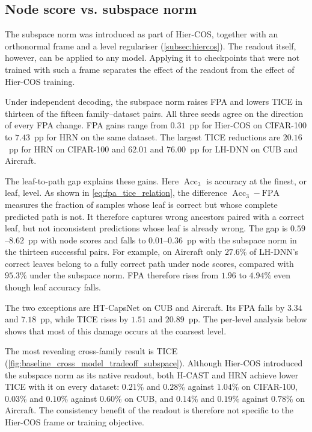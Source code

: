 \subsection{Node score vs. subspace norm}
\label{ssec:results_readout}

The subspace norm was introduced as part of Hier-COS, together with an
orthonormal frame and a level regulariser (\cref{subsec:hiercos}). The
readout itself, however, can be applied to any model. Applying it to checkpoints
that were not trained with such a frame separates the effect of the readout from
the effect of Hier-COS training.

Under independent decoding, the subspace norm raises FPA and lowers TICE in
thirteen of the fifteen family--dataset pairs. All three seeds agree on the
direction of every FPA change. FPA gains range from $0.31$~pp for Hier-COS on
CIFAR-100 to $7.43$~pp for HRN on the same dataset. The largest TICE reductions
are $20.16$~pp for HRN on CIFAR-100 and $62.01$ and $76.00$~pp for LH-DNN on CUB
and Aircraft.

The leaf-to-path gap explains these gains. Here $\operatorname{Acc}_3$ is
accuracy at the finest, or leaf, level. As shown in
\cref{eq:fpa_tice_relation}, the difference
$\operatorname{Acc}_3-\mathrm{FPA}$ measures the fraction of samples whose leaf
is correct but whose complete predicted path is not. It therefore captures wrong ancestors paired with a correct
leaf, but not inconsistent predictions whose leaf is already wrong. The gap is
$0.59$--$8.62$~pp with node scores and falls to $0.01$--$0.36$~pp with the
subspace norm in the thirteen successful pairs. For example, on Aircraft only
$27.6\%$ of LH-DNN's correct leaves belong to a fully correct path under node
scores, compared with $95.3\%$ under the subspace norm. FPA therefore rises from
$1.96$ to $4.94\%$ even though leaf accuracy falls.

The two exceptions are HT-CapsNet on CUB and Aircraft. Its FPA falls by $3.34$
and $7.18$~pp, while TICE rises by $1.51$ and $20.89$~pp. The per-level analysis
below shows that most of this damage occurs at the coarsest level.

The most revealing cross-family result is TICE
(\cref{fig:baseline_cross_model_tradeoff_subspace}). Although Hier-COS introduced
the subspace norm as its native readout, both H-CAST and HRN achieve lower TICE
with it on every dataset: $0.21\%$ and $0.28\%$ against $1.04\%$ on CIFAR-100,
$0.03\%$ and $0.10\%$ against $0.60\%$ on CUB, and $0.14\%$ and $0.19\%$ against
$0.78\%$ on Aircraft. The consistency benefit of the readout is therefore not
specific to the Hier-COS frame or training objective.

